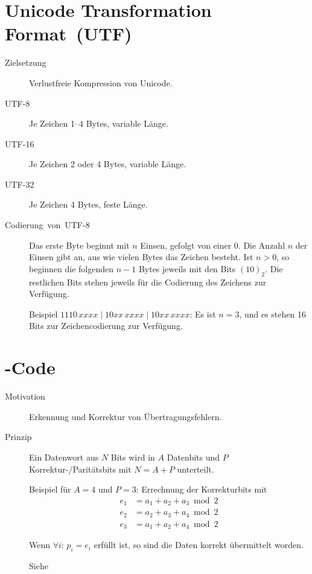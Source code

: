\section{Unicode Transformation Format~(UTF)}

\begin{description}
  \item [{Zielsetzung}] 
	Verlustfreie Kompression von Unicode.
  \item [{UTF-8}]
	Je Zeichen 1--4 Bytes, variable Länge.
  \item [{UTF-16}]
	Je Zeichen 2 oder 4 Bytes, variable Länge.
  \item [{UTF-32}]
	Je Zeichen 4 Bytes, feste Länge.
  \item [{Codierung~von~UTF-8}]
	Das erste Byte beginnt mit $n$ Einsen, gefolgt von einer 0.
	Die Anzahl $n$ der Einsen gibt an, aus wie vielen Bytes das Zeichen besteht.
	Ist $n>0$, so beginnen die folgenden $n-1$ Bytes jeweils mit den Bits $(10)_2$.
	Die restlichen Bits stehen jeweils für die Codierung des Zeichens zur Verfügung.

	Beispiel $1110 \, xxxx \mid 10xx \, xxxx \mid 10xx \, xxxx$: Es ist $n=3$, und es stehen 16 Bits zur Zeichencodierung zur Verfügung.
\end{description}

\section{\protect{}-Code}
\begin{description}
  \item [{Motivation}] 
	Erkennung und Korrektur von Übertragungsfehlern.
  \item [{Prinzip}]
	Ein Datenwort aus $N$ Bits wird in $A$ Datenbits und $P$ Korrektur-/Pa\-ri\-täts\-bits mit $N=A+P$ unterteilt.

	Beispiel für $A=4$ und $P=3$: Errechnung der Korrekturbits mit 
	\begin{align*}
	  e_1 & = a_1 + a_2 + a_3 \bmod 2\\
	  e_2 & = a_2 + a_3 + a_4 \bmod 2\\
	  e_3 & = a_1 + a_2 + a_4 \bmod 2
	\end{align*}

	Wenn $\forall i:\, p_i = e_i$ erfüllt ist, so sind die Daten korrekt übermittelt worden.

	Siehe \cite{wiki:Hammingcode,Voss2011}
\end{description}

